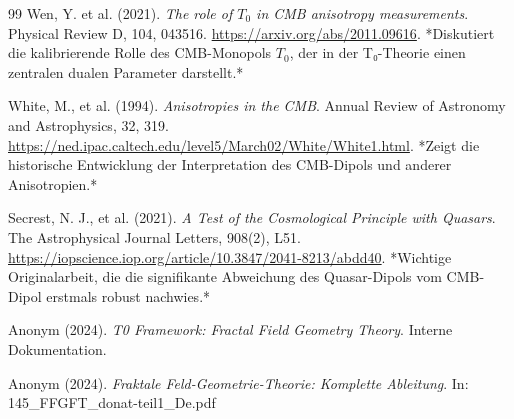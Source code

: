 \begin{thebibliography}{99}
		Wen, Y. et al. (2021). \textit{The role of \(T_0\) in CMB anisotropy measurements}. 
		Physical Review D, 104, 043516.
		\href{https://arxiv.org/abs/2011.09616}{https://arxiv.org/abs/2011.09616}.
		*Diskutiert die kalibrierende Rolle des CMB-Monopols \(T_0\), der in der T₀-Theorie einen zentralen dualen Parameter darstellt.*
		
		White, M., et al. (1994). \textit{Anisotropies in the CMB}. 
		Annual Review of Astronomy and Astrophysics, 32, 319.
		\href{https://ned.ipac.caltech.edu/level5/March02/White/White1.html}{https://ned.ipac.caltech.edu/level5/March02/White/White1.html}.
		*Zeigt die historische Entwicklung der Interpretation des CMB-Dipols und anderer Anisotropien.*
		
		Secrest, N. J., et al. (2021). \textit{A Test of the Cosmological Principle with Quasars}. 
		The Astrophysical Journal Letters, 908(2), L51.
		\href{https://iopscience.iop.org/article/10.3847/2041-8213/abdd40}{https://iopscience.iop.org/article/10.3847/2041-8213/abdd40}.
		*Wichtige Originalarbeit, die die signifikante Abweichung des Quasar-Dipols vom CMB-Dipol erstmals robust nachwies.*
		
		Anonym (2024). \textit{T0 Framework: Fractal Field Geometry Theory}. 
		Interne Dokumentation.
		
		Anonym (2024). \textit{Fraktale Feld-Geometrie-Theorie: Komplette Ableitung}. 
		In: 145\_FFGFT\_donat-teil1\_De.pdf
		
	\end{thebibliography}
